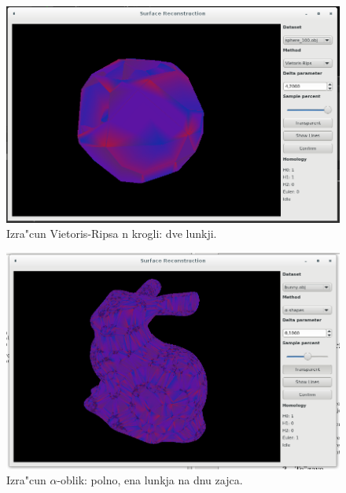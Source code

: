 \documentclass[11pt]{article}
\begin{document}
\begin{figure}[htb]
    \centering
    \includegraphics[width=1\textwidth]{vr_2hole.png}
    \caption{Izra"cun Vietoris-Ripsa n krogli: dve lunkji.}
    \label{fig:vr4}
\end{figure}

\begin{figure}[htb]
    \centering
    \includegraphics[width=1\textwidth]{alpha_full.png}
    \caption{Izra"cun $\alpha$-oblik: polno, ena lunkja na dnu zajca.}
    \label{fig:a1}
\end{figure}
\end{document}
